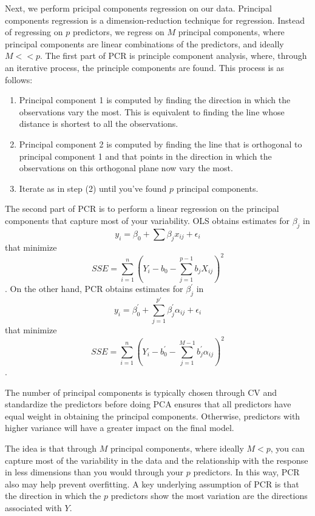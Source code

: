 \documentclass{article}
\begin{document}
Next, we perform pricipal components regression on our data. Principal components regression is a dimension-reduction technique for regression. Instead of regressing on $p$ predictors, we regress on $M$ principal components, where principal components are linear combinations of the predictors, and ideally $M<<p$. The first part of PCR is principle component analysis, where, through an iterative process, the principle components are found. This process is as follows: 

\begin{enumerate}
\item Principal component 1 is computed by finding the direction in which the observations vary the most. This is equivalent to finding the line whose distance is shortest to all the observations. 
\item Principal component 2 is computed by finding the line that is orthogonal to principal component 1 and that points in the direction in which the observations on this orthogonal plane now vary the most. 
\item Iterate as in step (2) until you've found $p$ principal components. 
\end{enumerate}

The second part of PCR is to perform a linear regression on the principal components that capture most of your variability. OLS obtains estimates for $\beta_j$ in $$y_i = \beta_0 + \sum \beta_jx_{ij} + \epsilon_i$$ that minimize $$SSE = \sum_{i=1}^{n}\left(Y_i - b_0 - \sum_{j=1}^{p-1}b_jX_{ij}\right)^2$$. On the other hand, PCR obtains estimates for $\beta_j^\prime$ in $$y_i = \beta_0^\prime + \sum_{j=1}^{p\prime}\beta_j^\prime \alpha_{ij} + \epsilon_i$$ that minimize $$SSE = \sum_{i=1}^{n}\left(Y_i - b_0^\prime - \sum_{j=1}^{M-1}b_j^\prime \alpha_{ij}\right)^2$$.

The number of principal components is typically chosen through CV and standardize the predictors before doing PCA ensures that all predictors have equal weight in obtaining the principal components. Otherwise, predictors with higher variance will have a greater impact on the final model.

The idea is that through $M$ principal components, where ideally $M<p$, you can capture most of the variability in the data and the relationship with the response in less dimensions than you would through your $p$ predictors. In this way, PCR also may help prevent overfitting. A key underlying assumption of PCR is that the direction in which the $p$ predictors show the most variation are the directions associated with $Y$. 
\end{document}
